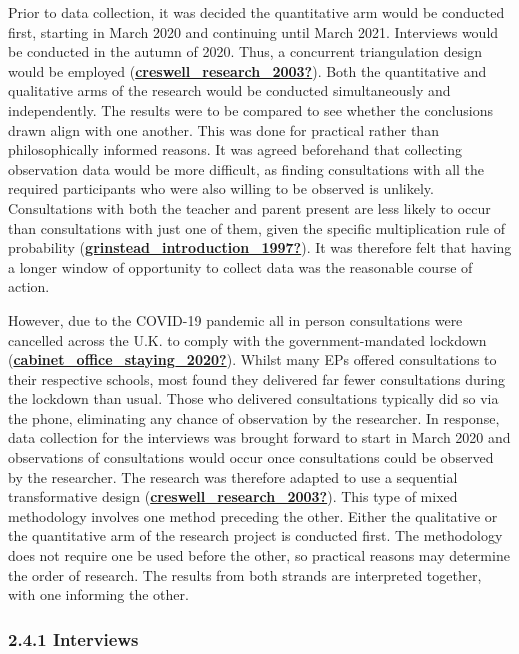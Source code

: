 \documentclass[
]{article}
\begin{document}
Prior to data collection, it was decided the quantitative arm would be
conducted first, starting in March 2020 and continuing until March 2021.
Interviews would be conducted in the autumn of 2020. Thus, a concurrent
triangulation design would be employed
(\protect\hyperlink{ref-creswell_research_2003}{\textbf{creswell\_research\_2003?}}).
Both the quantitative and qualitative arms of the research would be
conducted simultaneously and independently. The results were to be
compared to see whether the conclusions drawn align with one another.
This was done for practical rather than philosophically informed
reasons. It was agreed beforehand that collecting observation data would
be more difficult, as finding consultations with all the required
participants who were also willing to be observed is unlikely.
Consultations with both the teacher and parent present are less likely
to occur than consultations with just one of them, given the specific
multiplication rule of probability
(\protect\hyperlink{ref-grinstead_introduction_1997}{\textbf{grinstead\_introduction\_1997?}}).
It was therefore felt that having a longer window of opportunity to
collect data was the reasonable course of action.

However, due to the COVID-19 pandemic all in person consultations were
cancelled across the U.K. to comply with the government-mandated
lockdown
(\protect\hyperlink{ref-cabinet_office_staying_2020}{\textbf{cabinet\_office\_staying\_2020?}}).
Whilst many EPs offered consultations to their respective schools, most
found they delivered far fewer consultations during the lockdown than
usual. Those who delivered consultations typically did so via the phone,
eliminating any chance of observation by the researcher. In response,
data collection for the interviews was brought forward to start in March
2020 and observations of consultations would occur once consultations
could be observed by the researcher. The research was therefore adapted
to use a sequential transformative design
(\protect\hyperlink{ref-creswell_research_2003}{\textbf{creswell\_research\_2003?}}).
This type of mixed methodology involves one method preceding the other.
Either the qualitative or the quantitative arm of the research project
is conducted first. The methodology does not require one be used before
the other, so practical reasons may determine the order of research. The
results from both strands are interpreted together, with one informing
the other.

\hypertarget{interviews-1}{%
\subsubsection{2.4.1 Interviews}\label{interviews-1}}
\end{document}
